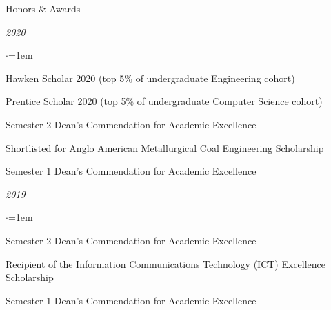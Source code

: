 \documentclass{resume} %
\begin{document}
\begin{rSection}{Honors \& Awards}
    \item \textit{2020}
    \begin{list}{$\cdot$}{\leftmargin=1em}
        \item Hawken Scholar 2020 (top 5\% of undergraduate Engineering cohort)
        \item Prentice Scholar 2020 (top 5\% of undergraduate Computer Science cohort)
        \item Semester 2 Dean's Commendation for Academic Excellence
        \item Shortlisted for Anglo American Metallurgical Coal Engineering Scholarship
        \item Semester 1 Dean's Commendation for Academic Excellence
    \end{list}

    \vspace{1em}

    \item \textit{2019}
    \begin{list}{$\cdot$}{\leftmargin=1em}
        \item Semester 2 Dean's Commendation for Academic Excellence
        \item Recipient of the Information Communications Technology (ICT) Excellence Scholarship
        \item Semester 1 Dean's Commendation for Academic Excellence
    \end{list}

\end{rSection}
\end{document}
